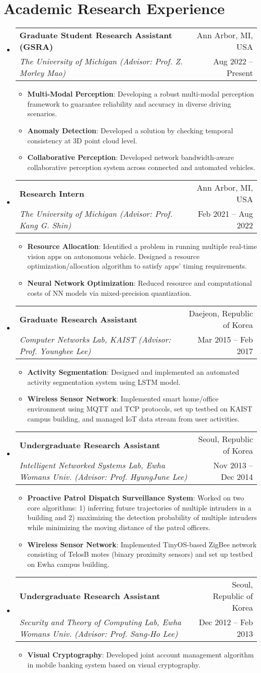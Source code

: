 \documentclass[letterpaper,oneside,11pt]{article}
\makeatletter
\newcommand{\resumeItem}[2]{
  \item\small{
    \textbf{#1}{: #2 \vspace{-2pt}}
  }
}
\newcommand{\resumeSubheading}[4]{
  \vspace{-2pt}\item
    \begin{tabularx}{0.97\textwidth}[t]{X@{\hspace{-5pt}}r}
      \textbf{#1} & #2 \\
      \textit{\small#3} & \small #4 \\
    \end{tabularx}\vspace{-6pt}
}
\newcommand{\resumeSubHeadingListStart}{\begin{itemize}[leftmargin=*]}
\newcommand{\resumeSubHeadingListEnd}{\end{itemize}}
\newcommand{\resumeItemListStart}{\begin{itemize}}
\newcommand{\resumeItemListEnd}{\end{itemize}\vspace{-5pt}}
\makeatother
\begin{document}
\section{Academic Research Experience}
  \resumeSubHeadingListStart
    \resumeSubheading
    {Graduate Student Research Assistant (GSRA)}{Ann Arbor, MI, USA}
    {The University of Michigan (Advisor: Prof. Z. Morley Mao)}{Aug 2022 -- Present}
    \resumeItemListStart
      \resumeItem{Multi-Modal Perception}{Developing a robust multi-modal perception framework to guarantee reliability and accuracy in diverse driving scenarios.}
      \resumeItem{Anomaly Detection}{Developed a solution by checking temporal consistency at 3D point cloud level.}
      \resumeItem{Collaborative Perception}{Developed network bandwidth-aware collaborative perception system across connected and automated vehicles.}
    \resumeItemListEnd
    \resumeSubheading
      {Research Intern}{Ann Arbor, MI, USA}
      {The University of Michigan (Advisor: Prof. Kang G. Shin)}{Feb 2021 -- Aug 2022}
      \resumeItemListStart
        \resumeItem{Resource Allocation}{Identified a problem in running multiple real-time vision apps on autonomous vehicle. Designed a resource optimization/allocation algorithm to satisfy apps' timing requirements.}
        \resumeItem{Neural Network Optimization}{Reduced resource and computational costs of NN models via mixed-precision quantization.}
      \resumeItemListEnd
    \resumeSubheading
      {Graduate Research Assistant}{Daejeon, Republic of Korea}
      {Computer Networks Lab, KAIST (Advisor: Prof. Younghee Lee)}{Mar 2015 -- Feb 2017}
      \resumeItemListStart
        \resumeItem{Activity Segmentation}{Designed and implemented an automated activity segmentation system using LSTM model.}
        \resumeItem{Wireless Sensor Network}{Implemented smart home/office environment using MQTT and TCP protocols, set up testbed on KAIST campus building, and managed IoT data stream from user activities.}
      \resumeItemListEnd
    \resumeSubheading
      {Undergraduate Research Assistant}{Seoul, Republic of Korea}
      {Intelligent Networked Systems Lab, Ewha Womans Univ. (Advisor: Prof. HyungJune Lee)}{Nov 2013 -- Dec 2014}
      \resumeItemListStart   
        \resumeItem{Proactive Patrol Dispatch Surveillance System}{Worked on two core algorithms: 1) inferring future trajectories of multiple intruders in a building and 2) maximizing the detection probability of multiple intruders while minimizing the moving distance of the patrol officers.}
        \resumeItem{Wireless Sensor Network}{Implemented TinyOS-based ZigBee network consisting of TelosB motes (binary proximity sensors) and set up testbed on Ewha campus building.}
      \resumeItemListEnd
    \resumeSubheading
      {Undergraduate Research Assistant}{Seoul, Republic of Korea}
      {Security and Theory of Computing Lab, Ewha Womans Univ. (Advisor: Prof. Sang-Ho Lee)}{Dec 2012 -- Feb 2013}
      \resumeItemListStart
        \resumeItem{Visual Cryptography}{Developed joint account management algorithm in mobile banking system based on visual cryptography.}
      \resumeItemListEnd
  \resumeSubHeadingListEnd
\end{document}
